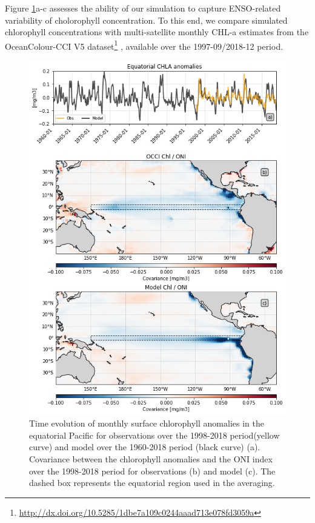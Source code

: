 Figure \ref{fig:nemo-sat-chl}a-c assesses the ability of our simulation to capture ENSO-related variability of cholorophyll concentration. To this end, we compare simulated chlorophyll concentrations with multi-satellite monthly CHL-a estimates from the OceanColour-CCI V5  dataset\footnote{\url{http://dx.doi.org/10.5285/1dbe7a109c0244aaad713e078fd3059a}} \citep{sathyendranathOceanColourTimeSeries2019}, available over the 1997-09/2018-12 period. 

\begin{figure}[h!tp]
	\centering
	\includegraphics[scale=0.4]{figs/fig2.png}
	\caption{Time evolution of monthly surface chlorophyll anomalies in the equatorial Pacific for observations over the  1998-2018 period(yellow curve) and  model over the  1960-2018 period (black curve) (a). Covariance between the chlorophyll anomalies and the ONI index over the 1998-2018 period for observations (b) and model (c). The dashed box represents the equatorial region used in the averaging.}
	\label{fig:nemo-sat-chl}
\end{figure}

